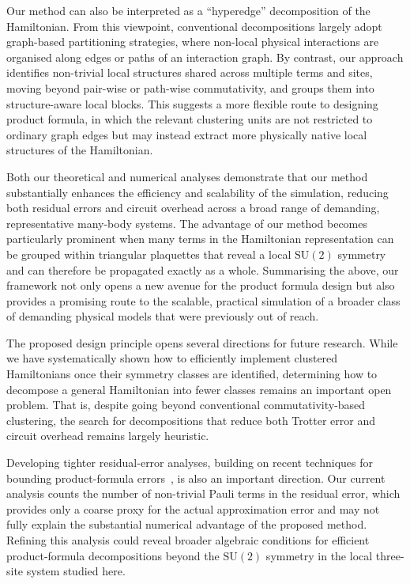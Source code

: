\documentclass[aps,showpacs,amsmath,amssymb,twocolumn,prx,longbibliography,superscriptaddress,notitlepage,floatfix,10pt]{revtex4-2}
\begin{document}
Our method can also be interpreted as a ``hyperedge'' decomposition of the Hamiltonian.
From this viewpoint, conventional decompositions largely adopt graph-based partitioning strategies, where non-local physical interactions are organised along edges or paths of an interaction graph.
By contrast, our approach identifies non-trivial local structures shared across multiple terms and sites, moving beyond pair-wise or path-wise commutativity, and groups them into structure-aware local blocks.
This suggests a more flexible route to designing product formula, in which the relevant clustering units are not restricted to ordinary graph edges but may instead extract more physically native local structures of the Hamiltonian.

Both our theoretical and numerical analyses demonstrate that our method substantially enhances the efficiency and scalability of the simulation, reducing both residual errors and circuit overhead across a broad range of demanding, representative many-body systems.
The advantage of our method becomes particularly prominent when many terms in the Hamiltonian representation can be grouped within triangular plaquettes that reveal a local $\mathrm{SU}(2)$ symmetry and can therefore be propagated exactly as a whole.
Summarising the above, our framework not only opens a new avenue for the product formula design but also provides a promising route to the scalable, practical simulation of a broader class of demanding physical models that were previously out of reach.

The proposed design principle opens several directions for future research.
While we have systematically shown how to efficiently implement clustered Hamiltonians once their symmetry classes are identified, determining how to decompose a general Hamiltonian into fewer classes remains an important open problem.
That is, despite going beyond conventional commutativity-based clustering, the search for decompositions that reduce both Trotter error and circuit overhead remains largely heuristic.

Developing tighter residual-error analyses, building on recent techniques for bounding product-formula errors~\cite{Childs2021Theory, Yuan2021Quantum, Watson2025Exponentially}, is also an important direction.
Our current analysis counts the number of non-trivial Pauli terms in the residual error, which provides only a coarse proxy for the actual approximation error and may not fully explain the substantial numerical advantage of the proposed method.
Refining this analysis could reveal broader algebraic conditions for efficient product-formula decompositions beyond the $\mathrm{SU}(2)$ symmetry in the local three-site system studied here.
\end{document}
